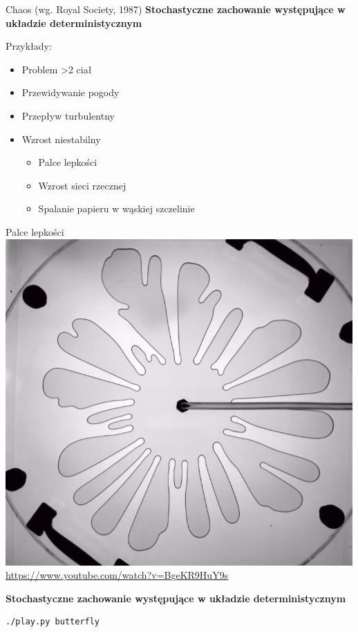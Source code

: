 \documentclass{beamer}
\begin{document}
\begin{frame}{Chaos (wg. Royal Society, 1987)}
\pause
\textbf{ Stochastyczne zachowanie występujące w układzie deterministycznym}\pause

Przykłady:\pause
\begin{itemize}[<+->]
\item Problem >2 ciał
\item Przewidywanie pogody
\item Przepływ turbulentny
\item Wzrost niestabilny
	\begin{itemize}[<+->]
		\item Palce lepkości
		\item Wzrost sieci rzecznej
		\item Spalanie papieru w wąskiej szczelinie
	\end{itemize} 
\end{itemize} 
\end{frame}

\begin{frame}{Palce lepkości}
\centering
\includegraphics[height=0.6\textheight]{viscous_fingers}
\url{https://www.youtube.com/watch?v=BgeKR9HuY9s}

\end{frame}

\begin{frame}[fragile]
\textbf{Stochastyczne zachowanie występujące w układzie deterministycznym}
\begin{lstlisting}
./play.py butterfly
\end{lstlisting}
\end{frame}
\end{document}
